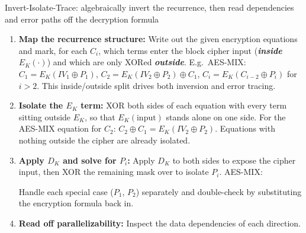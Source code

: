 \documentclass[12pt, a4paper]{article}
\newcommand{\term}[1]{\textbf{\textit{#1}}}        %
\begin{document}
\begin{schemebox}{Invert-Isolate-Trace: algebraically invert the recurrence, then read dependencies and error paths off the decryption formula}
\begin{enumerate}[label=\textbf{Step \arabic*:}, leftmargin=*]
    \item \textbf{Map the recurrence structure:} Write out the given encryption equations and mark, for each $C_i$, which terms enter the block cipher input (\term{inside} $E_K(\cdot)$) and which are only XORed \term{outside}. E.g.\ AES-MIX: $C_1 = E_K(IV_1 \oplus P_1)$, $C_2 = E_K(IV_2 \oplus P_2) \oplus C_1$, $C_i = E_K(C_{i-2} \oplus P_i)$ for $i > 2$. This inside/outside split drives both inversion and error tracing.
    \item \textbf{Isolate the $E_K$ term:} XOR both sides of each equation with every term sitting outside $E_K$, so that $E_K(\text{input})$ stands alone on one side. For the AES-MIX equation for $C_2$: $C_2 \oplus C_1 = E_K(IV_2 \oplus P_2)$. Equations with nothing outside the cipher are already isolated.
    \item \textbf{Apply $D_K$ and solve for $P_i$:} Apply $D_K$ to both sides to expose the cipher input, then XOR the remaining mask over to isolate $P_i$. AES-MIX:  Handle each special case ($P_1$, $P_2$) separately and double-check by substituting the encryption formula back in.
    \item \textbf{Read off parallelizability:} Inspect the data dependencies of each direction. 

\end{enumerate}
\end{schemebox}
\end{document}
